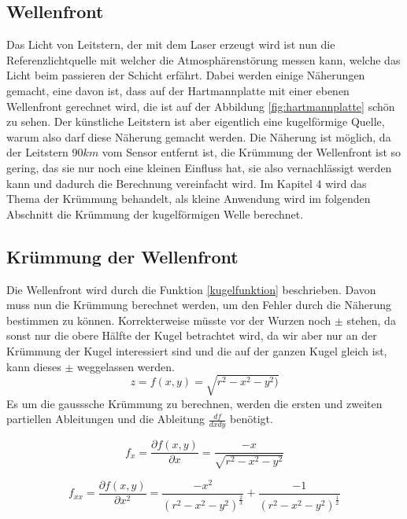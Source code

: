 \begin{refsection}
\section{Wellenfront}
Das Licht von Leitstern, der mit dem Laser erzeugt wird ist nun die Referenzlichtquelle mit welcher die Atmosphärenstörung messen kann, welche das Licht beim passieren der Schicht erfährt. Dabei werden einige Näherungen gemacht, eine davon ist, dass auf der Hartmannplatte mit einer ebenen Wellenfront gerechnet wird, die ist auf der Abbildung \ref{fig:hartmannplatte} schön zu sehen. Der künstliche Leitstern ist aber eigentlich eine kugelförmige Quelle, warum also darf diese Näherung gemacht werden. Die Näherung ist möglich, da der Leitstern 90$km$ vom Sensor entfernt ist, die Krümmung der Wellenfront ist so gering, das sie nur noch eine kleinen Einfluss hat, sie also vernachlässigt werden kann und dadurch die Berechnung vereinfacht wird. Im Kapitel 4 wird das Thema der Krümmung behandelt, als kleine Anwendung wird im folgenden Abschnitt die Krümmung der kugelförmigen Welle berechnet.

\subsection{Krümmung der Wellenfront}
Die Wellenfront wird durch die Funktion \eqref{kugelfunktion} beschrieben. Davon muss nun die Krümmung berechnet werden, um den Fehler durch die Näherung bestimmen zu können. Korrekterweise müsste vor der Wurzen noch $\pm$ stehen, da sonst nur die obere Hälfte der Kugel betrachtet wird, da wir aber nur an der Krümmung der Kugel interessiert sind und die auf der ganzen Kugel gleich ist, kann dieses $\pm$ weggelassen werden.
\begin{equation}\label{kugelfunktion}
z=f(x,y)=\sqrt{r^{2}-x^{2}-y^{2})}
\end{equation}
Es um die gausssche Krümmung zu berechnen, werden die ersten und zweiten partiellen Ableitungen und die Ableitung $ \frac{df}{dxdy}$ benötigt.

\begin{equation}\label{Ableitungen x}
f_{x}=\dfrac{\partial f(x,y)}{\partial x}= \dfrac{-x}{\sqrt{r^{2}-x^{2}-y^{2}}}
\end{equation}

\begin{equation}\label{Ableitungen xx}
f_{xx}=\dfrac{\partial f(x,y)}{\partial x^{2}}= \dfrac{- x^2}{(r^2 - x^2 - y^2)^{\frac{2}{3}}}+\dfrac{ - 1}{(r^2 - x^2 - y^2)^{\frac{1}{2}}}
\end{equation}


\end{refsection}
